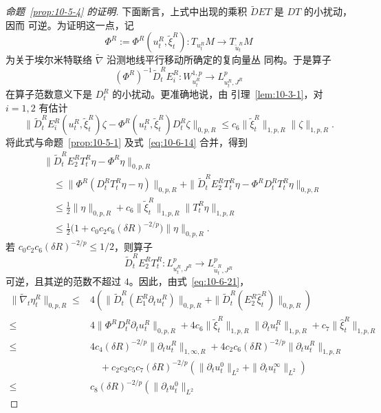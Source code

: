 \begin{proof}[命题~\ref{prop:10-5-4} 的证明]
下面断言，上式中出现的乘积 $\widetilde D E T$ 是 $DT$ 的小扰动，因而
可逆。为证明这一点，记
\[
  \Phi^R:=\Phi^R(u_t^R,\widetilde\xi_t^R):
  T_{u_t^R}M\longrightarrow T_{\widetilde u_t^R}M
\]
为关于埃尔米特联络 $\widetilde\nabla$ 沿测地线平行移动所确定的复向量丛
同构。于是算子
\[
  (\Phi^R)^{-1}\widetilde D_t^RE_i^R:
  W_{u_t^R}^{1,p}\longrightarrow L_{u_t^R,J^R}^p
\]
在算子范数意义下是 $D_t^R$ 的小扰动。更准确地说，由
引理~\ref{lem:10-3-1}，对 $i=1,2$ 有估计
\begin{equation}\label{eq:10-6-22}
  \bigl\|
    \widetilde D_t^RE_i^R(u_t^R,\widetilde\xi_t^R)\zeta
    -\Phi^R(u_t^R,\widetilde\xi_t^R)D_t^R\zeta
  \bigr\|_{0,p,R}
  \le c_6\|\widetilde\xi_t^R\|_{1,p,R}\|\zeta\|_{1,p,R}.
\end{equation}
将此式与命题~\ref{prop:10-5-1} 及式~\eqref{eq:10-6-14} 合并，得到
\[
\begin{aligned}
 &\|\widetilde D_t^RE_2^RT_t^R\eta-\Phi^R\eta\|_{0,p,R}\\
 &\quad\le
   \|\Phi^R(D_t^RT_t^R\eta-\eta)\|_{0,p,R}
   +\|\widetilde D_t^RE_2^RT_t^R\eta
      -\Phi^RD_t^RT_t^R\eta\|_{0,p,R}\\
 &\quad\le\frac12\|\eta\|_{0,p,R}
   +c_6\|\widetilde\xi_t^R\|_{1,p,R}
          \|T_t^R\eta\|_{1,p,R}\\
 &\quad\le\frac12
   \bigl(1+c_0c_2c_6(\delta R)^{-2/p}\bigr)
   \|\eta\|_{0,p,R}.
\end{aligned}
\]
若 $c_0c_2c_6(\delta R)^{-2/p}\le1/2$，则算子
\[
  \widetilde D_t^RE_2^RT_t^R:
  L_{u_t^R,J^R}^p\longrightarrow L_{\widetilde u_t^R,J^R}^p
\]
可逆，且其逆的范数不超过 $4$。因此，由式~\eqref{eq:10-6-21}，
\[
\begin{aligned}
  \|\widetilde\nabla_t\eta_t^R\|_{0,p,R}
  \le{}&4\left(
    \|\widetilde D_t^R(E_1^R\partial_tu_t^R)\|_{0,p,R}
    +\|\widetilde D_t^R(E_2^R\widehat\xi_t^R)\|_{0,p,R}
  \right)\\
  \le{}&4\|\Phi^RD_t^R\partial_tu_t^R\|_{0,p,R}
    +4c_6\|\widetilde\xi_t^R\|_{1,p,R}
            \|\partial_tu_t^R\|_{1,p,R}
    +c_7\|\widehat\xi_t^R\|_{1,p,R}\\
  \le{}&4c_4(\delta R)^{-2/p}\|\partial_tu_t^R\|_{1,\infty,R}
    +4c_2c_6(\delta R)^{-2/p}\|\partial_tu_t^R\|_{1,p,R}\\
  &\quad+c_2c_3c_5c_7(\delta R)^{-2/p}
    \left(
      \|\partial_tu_t^0\|_{L^2}
      +\|\partial_tu_t^\infty\|_{L^2}
    \right)\\
  \le{}&c_8(\delta R)^{-2/p}
    \left(
      \|\partial_tu_t^0\|_{L^2}

\end{aligned}\]
\end{proof}
